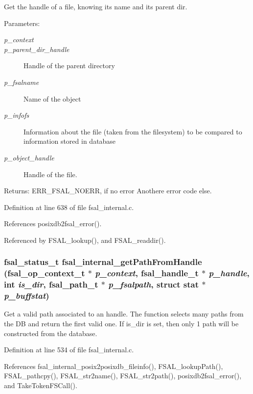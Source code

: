 Get the handle of a file, knowing its name and its parent dir. 

\begin{Desc}
\item[Parameters:]
\begin{description}
\item[{\em p\_\-context}]\item[{\em p\_\-parent\_\-dir\_\-handle}]Handle of the parent directory \item[{\em p\_\-fsalname}]Name of the object \item[{\em p\_\-infofs}]Information about the file (taken from the filesystem) to be compared to information stored in database \item[{\em p\_\-object\_\-handle}]Handle of the file.\end{description}
\end{Desc}
\begin{Desc}
\item[Returns:]ERR\_\-FSAL\_\-NOERR, if no error Anothere error code else. \end{Desc}


Definition at line 638 of file fsal\_\-internal.c.

References posixdb2fsal\_\-error().

Referenced by FSAL\_\-lookup(), and FSAL\_\-readdir().
\subsubsection{\setlength{\rightskip}{0pt plus 5cm}fsal\_\-status\_\-t fsal\_\-internal\_\-get\-Path\-From\-Handle (fsal\_\-op\_\-context\_\-t $\ast$ {\em p\_\-context}, fsal\_\-handle\_\-t $\ast$ {\em p\_\-handle}, int {\em is\_\-dir}, fsal\_\-path\_\-t $\ast$ {\em p\_\-fsalpath}, struct stat $\ast$ {\em p\_\-buffstat})}\label{fsal__internal_8c_a23}


Get a valid path associated to an handle. The function selects many paths from the DB and return the first valid one. If is\_\-dir is set, then only 1 path will be constructed from the database. 

Definition at line 534 of file fsal\_\-internal.c.

References fsal\_\-internal\_\-posix2posixdb\_\-fileinfo(), FSAL\_\-lookup\-Path(), FSAL\_\-pathcpy(), FSAL\_\-str2name(), FSAL\_\-str2path(), posixdb2fsal\_\-error(), and Take\-Token\-FSCall().

